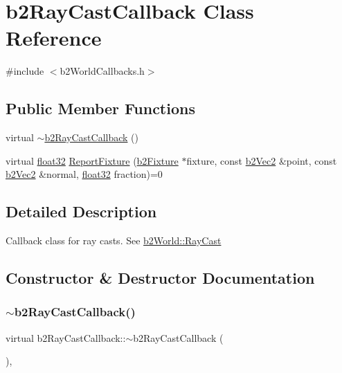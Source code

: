 \hypertarget{classb2_ray_cast_callback}{}\section{b2\+Ray\+Cast\+Callback Class Reference}
\label{classb2_ray_cast_callback}


{\ttfamily \#include $<$b2\+World\+Callbacks.\+h$>$}

\subsection*{Public Member Functions}
\begin{DoxyCompactItemize}
\item 
virtual \mbox{\hyperlink{classb2_ray_cast_callback_a8d7bab364f08f8ab122b59560355a739}{$\sim$b2\+Ray\+Cast\+Callback}} ()
\item 
virtual \mbox{\hyperlink{b2_settings_8h_aacdc525d6f7bddb3ae95d5c311bd06a1}{float32}} \mbox{\hyperlink{classb2_ray_cast_callback_a658d5c8e89e0c73230cc8bddade4f3a4}{Report\+Fixture}} (\mbox{\hyperlink{classb2_fixture}{b2\+Fixture}} $\ast$fixture, const \mbox{\hyperlink{structb2_vec2}{b2\+Vec2}} \&point, const \mbox{\hyperlink{structb2_vec2}{b2\+Vec2}} \&normal, \mbox{\hyperlink{b2_settings_8h_aacdc525d6f7bddb3ae95d5c311bd06a1}{float32}} fraction)=0
\end{DoxyCompactItemize}


\subsection{Detailed Description}
Callback class for ray casts. See \mbox{\hyperlink{classb2_world_aa9955d94a254253997daaf16ce77bab6}{b2\+World\+::\+Ray\+Cast}} 

\subsection{Constructor \& Destructor Documentation}
\mbox{\label{classb2_ray_cast_callback_a8d7bab364f08f8ab122b59560355a739}} 
\subsubsection{\texorpdfstring{$\sim$b2RayCastCallback()}{~b2RayCastCallback()}}
{\footnotesize\ttfamily virtual b2\+Ray\+Cast\+Callback\+::$\sim$b2\+Ray\+Cast\+Callback (\begin{DoxyParamCaption}{ }\end{DoxyParamCaption})\hspace{0.3cm}{\ttfamily [inline]}, {\ttfamily [virtual]}}



